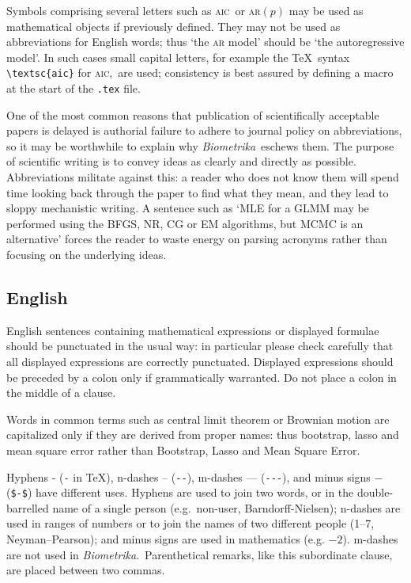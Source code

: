 \documentclass[supplementary,lineno]{biometrika}
\def\Bka{{\it Biometrika}}
\def\AIC{\textsc{aic}}
\begin{document}
Symbols comprising several letters such as \AIC\ or \textsc{ar}$(p)$ may be used as mathematical objects if previously defined. They may not be used as abbreviations for English words; thus `the \textsc{ar} model' should be `the autoregressive model'.   In such cases small capital letters, for example the  \TeX\ syntax \verb+\textsc{aic}+ for \AIC,\ are used; consistency is best assured by defining a macro at the start of the \texttt{.tex}  file.

One of the most common reasons that publication of scientifically acceptable papers is delayed is authorial  failure to adhere to journal policy on abbreviations, so it may be worthwhile to explain why \Bka\ eschews them. The purpose of scientific writing is to convey ideas as clearly and directly as possible.  Abbreviations militate against this: a reader who does not know them will spend time looking back through the paper to find what they mean, and they lead to sloppy mechanistic writing. A sentence such as `MLE for a GLMM may be performed using the BFGS, NR, CG or EM algorithms, but MCMC is an alternative' forces the reader to waste energy on parsing acronyms  rather than focusing on the underlying ideas.

\subsection{English}

English sentences containing mathematical expressions or displayed formulae should be punctuated in the usual way: in particular please check carefully that all displayed expressions are correctly punctuated.  Displayed expressions should be preceded by a colon only if grammatically warranted. Do not place a colon in the middle of a clause.

Words in common terms such as central limit theorem or Brownian motion are capitalized only if they are derived from proper names: thus bootstrap,  lasso and mean square error rather than Bootstrap, Lasso and  Mean Square Error.

Hyphens - (\verb+-+ in \TeX), n-dashes -- (\verb+--+), m-dashes --- (\verb+---+), and minus signs $-$ (\verb+$-$+) have different uses.  Hyphens are used to join two words, or in the double-barrelled name of a single person (e.g.\ non-user, Barndorff-Nielsen); n-dashes are used in ranges of numbers or to join the names of two different people (1--7, Neyman--Pearson); and minus signs are used in mathematics (e.g. $-2$). m-dashes are not used in \Bka.\  Parenthetical remarks, like this subordinate clause, are placed between two commas.
\end{document}
